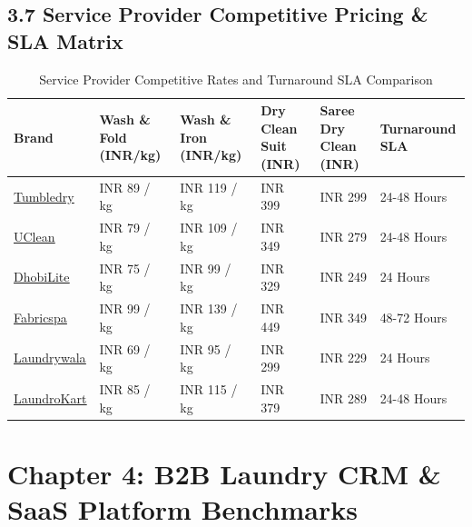 \documentclass[11pt,a4paper]{article}
\begin{document}
\clearpage

\subsection{3.7 Service Provider Competitive Pricing \& SLA Matrix}

\begin{table}[h!]
\centering
\small
\begin{tabularx}{\textwidth}{XXXXXX}
\toprule
\textbf{Brand} & \textbf{Wash \& Fold (INR/kg)} & \textbf{Wash \& Iron (INR/kg)} & \textbf{Dry Clean Suit (INR)} & \textbf{Saree Dry Clean (INR)} & \textbf{Turnaround SLA} \\
\midrule
\href{https://tumbledry.in}{\underline{Tumbledry}} & INR 89 / kg & INR 119 / kg & INR 399 & INR 299 & 24-48 Hours \\
\href{https://uclean.in}{\underline{UClean}} & INR 79 / kg & INR 109 / kg & INR 349 & INR 279 & 24-48 Hours \\
\href{https://dhobilite.com}{\underline{DhobiLite}} & INR 75 / kg & INR 99 / kg & INR 329 & INR 249 & 24 Hours \\
\href{https://fabricspa.com}{\underline{Fabricspa}} & INR 99 / kg & INR 139 / kg & INR 449 & INR 349 & 48-72 Hours \\
\href{https://laundrywala.in}{\underline{Laundrywala}} & INR 69 / kg & INR 95 / kg & INR 299 & INR 229 & 24 Hours \\
\href{https://laundrykart.com}{\underline{LaundroKart}} & INR 85 / kg & INR 115 / kg & INR 379 & INR 289 & 24-48 Hours \\
\bottomrule
\end{tabularx}
\caption{Service Provider Competitive Rates and Turnaround SLA Comparison}
\end{table}

\clearpage

\section{Chapter 4: B2B Laundry CRM \& SaaS Platform Benchmarks}
\end{document}
